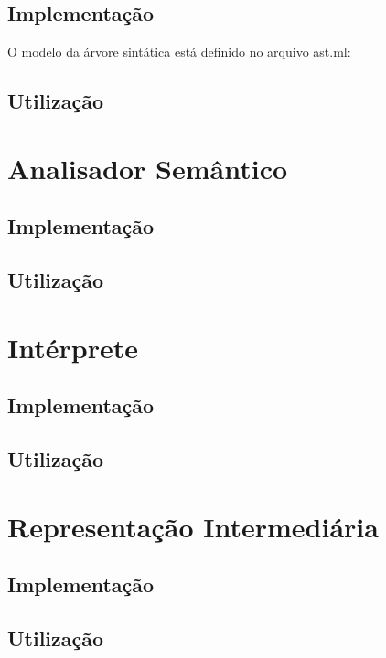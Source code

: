 \documentclass[12pt,a4paper,twoside]{report}
\begin{document}
\subsection{Implementação}

O modelo da árvore sintática está definido no arquivo ast.ml:



\subsection{Utilização}


\section{Analisador Semântico}

\subsection{Implementação}

\subsection{Utilização}


\section{Intérprete}

\subsection{Implementação}

\subsection{Utilização}


\section{Representação Intermediária}

\subsection{Implementação}

\subsection{Utilização}
\end{document}

